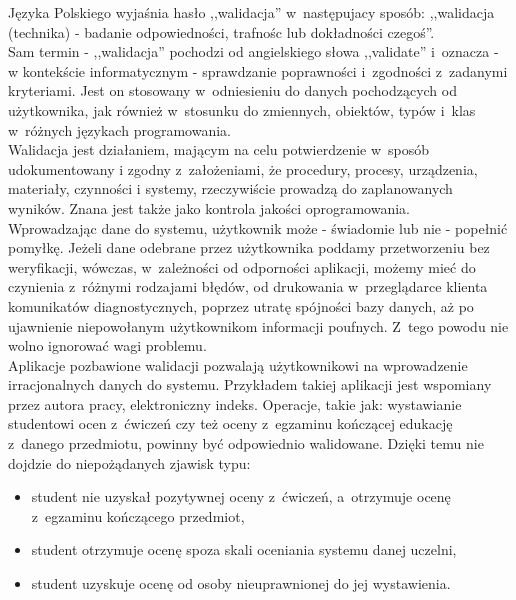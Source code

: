 \documentclass{xmgr}
\begin{document}
Języka Polskiego wyjaśnia hasło ,,walidacja'' w~następujacy sposób: ,,walidacja
(technika) - badanie odpowiedności, trafnośc lub dokładności czegoś''.\cite{ValidationSJP}
\\
\indent Sam termin - ,,walidacja'' pochodzi od angielskiego słowa ,,validate'' i~oznacza -
w kontekście informatycznym - sprawdzanie poprawności i~zgodności z~zadanymi
kryteriami. Jest on stosowany w~odniesieniu do danych pochodzących od użytkownika,
jak również w~stosunku do zmiennych, obiektów, typów i~klas w~różnych językach
programowania.\cite{ValidationTermin}
\\
\indent Walidacja jest działaniem, mającym na celu potwierdzenie w~sposób udokumentowany
i zgodny z~założeniami, że procedury, procesy, urządzenia, materiały, czynności
i systemy, rzeczywiście prowadzą do zaplanowanych wyników. Znana jest także jako
kontrola jakości oprogramowania.\cite{Validation2}
\\
\indent Wprowadzając dane do systemu, użytkownik może - świadomie lub nie - popełnić
pomyłkę. Jeżeli dane odebrane przez użytkownika poddamy przetworzeniu bez weryfikacji,
wówczas, w~zależności od odporności aplikacji, możemy mieć do czynienia z~różnymi
rodzajami błędów, od drukowania w~przeglądarce klienta komunikatów diagnostycznych,
poprzez utratę spójności bazy danych, aż po ujawnienie niepowołanym użytkownikom
informacji poufnych. Z~tego powodu nie wolno ignorować wagi problemu.
\\
\indent Aplikacje pozbawione walidacji pozwalają użytkownikowi na wprowadzenie irracjonalnych
danych do systemu. Przykładem takiej aplikacji jest wspomiany przez autora pracy,
elektroniczny indeks. Operacje, takie jak: wystawianie studentowi ocen z~ćwiczeń
czy też oceny z~egzaminu kończącej edukację z~danego przedmiotu, powinny być
odpowiednio walidowane. Dzięki temu nie dojdzie do niepożądanych zjawisk typu:
\begin{itemize}
\item student nie uzyskał pozytywnej oceny z~ćwiczeń, a~otrzymuje ocenę z~egzaminu
kończącego przedmiot,
\item student otrzymuje ocenę spoza skali oceniania systemu danej uczelni,
\item student uzyskuje ocenę od osoby nieuprawnionej do jej wystawienia.
\end{itemize}
\end{document}
